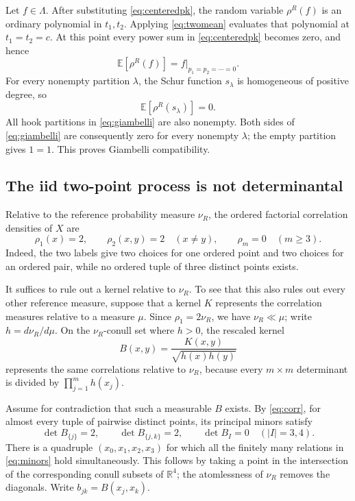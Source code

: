 \documentclass[11pt]{article}
\newcommand{\R}{\mathbb R}
\newcommand{\E}{\mathbb E}
\begin{document}
Let $f\in\Lambda$.  After substituting \eqref{eq:centeredpk}, the random
variable $\rho^R(f)$ is an ordinary polynomial in $t_1,t_2$.  Applying
\eqref{eq:twomean} evaluates that polynomial at $t_1=t_2=c$.  At this point
every power sum in \eqref{eq:centeredpk} becomes zero, and hence
\begin{equation}\label{eq:counit}
 \E[\rho^R(f)]=f\big|_{p_1=p_2=\cdots=0}.
\end{equation}
For every nonempty partition $\lambda$, the Schur function $s_\lambda$ is
homogeneous of positive degree, so
\begin{equation}\label{eq:schurzero}
 \E[\rho^R(s_\lambda)]=0.
\end{equation}
All hook partitions in \eqref{eq:giambelli} are also nonempty.  Both sides of
\eqref{eq:giambelli} are consequently zero for every nonempty $\lambda$;
the empty partition gives $1=1$.  This proves Giambelli compatibility.

\subsection*{The iid two-point process is not determinantal}

Relative to the reference probability measure $\nu_R$, the ordered factorial
correlation densities of $X$ are
\begin{equation}\label{eq:corr}
 \rho_1(x)=2,\qquad \rho_2(x,y)=2\quad(x\ne y),
 \qquad \rho_m=0\quad(m\ge3).
\end{equation}
Indeed, the two labels give two choices for one ordered point and two choices
for an ordered pair, while no ordered tuple of three distinct points exists.

It suffices to rule out a kernel relative to $\nu_R$.  To see that this also
rules out every other reference measure, suppose that a kernel $K$ represents
the correlation measures relative to a measure $\mu$.  Since
$\rho_1=2\nu_R$, we have $\nu_R\ll\mu$; write $h=d\nu_R/d\mu$.  On the
$\nu_R$-conull set where $h>0$, the rescaled kernel
\begin{equation}\label{eq:rescale}
 B(x,y)=\frac{K(x,y)}{\sqrt{h(x)h(y)}}
\end{equation}
represents the same correlations relative to $\nu_R$, because every
$m\times m$ determinant is divided by $\prod_{j=1}^m h(x_j)$.

Assume for contradiction that such a measurable $B$ exists.  By
\eqref{eq:corr}, for almost every tuple of pairwise distinct points, its
principal minors satisfy
\begin{equation}\label{eq:minors}
 \det B_{\{j\}}=2,\qquad
 \det B_{\{j,k\}}=2,\qquad
 \det B_I=0\quad (|I|=3,4).
\end{equation}
There is a quadruple $(x_0,x_1,x_2,x_3)$ for which all the finitely many
relations in \eqref{eq:minors} hold simultaneously.  This follows by taking
a point in the intersection of the corresponding conull subsets of
$\R^4$; the atomlessness of $\nu_R$ removes the diagonals.  Write
$b_{jk}=B(x_j,x_k)$.
\end{document}
